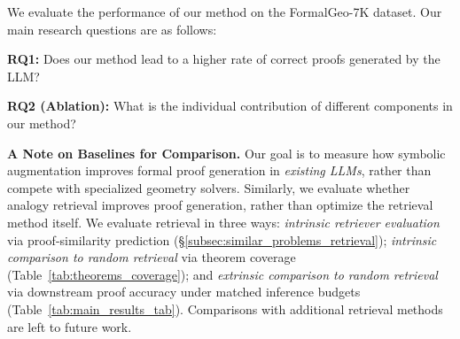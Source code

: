 






We evaluate the performance of our method on the FormalGeo-7K dataset. Our main research questions are as follows:

\noindent\textbf{RQ1:} Does our method lead to a higher rate of correct proofs generated by the LLM?


\noindent\textbf{RQ2 (Ablation):} What is the individual contribution of different components in our method?



\noindent\textbf{A Note on Baselines for Comparison.}
Our goal is to measure how symbolic augmentation improves formal proof generation in \emph{existing LLMs}, rather than compete with specialized geometry solvers. Similarly, we evaluate whether analogy retrieval improves proof generation, rather than optimize the retrieval method itself. We evaluate retrieval in three ways: \emph{intrinsic retriever evaluation} via proof-similarity prediction (\S\ref{subsec:similar_problems_retrieval}); \emph{intrinsic comparison to random retrieval} via theorem coverage (Table~\ref{tab:theorems_coverage}); and \emph{extrinsic comparison to random retrieval} via downstream proof accuracy under matched inference budgets (Table~\ref{tab:main_results_tab}). Comparisons with additional retrieval methods are left to future work.
